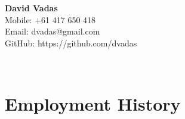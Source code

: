 \documentclass[]{article}
\begin{document}
\hrulefill
\begin{center}
\Huge{\textbf{David Vadas}}\\
\vspace{0.5cm}
\normalsize
Mobile: +61 417 650 418\\
Email: dvadas@gmail.com\\ %
GitHub: https://github.com/dvadas
\end{center}
\hrulefill
\\
\vspace{0.08in}

\section*{Employment History}
\setlength{\tabcolsep}{0.1cm}
\end{document}
